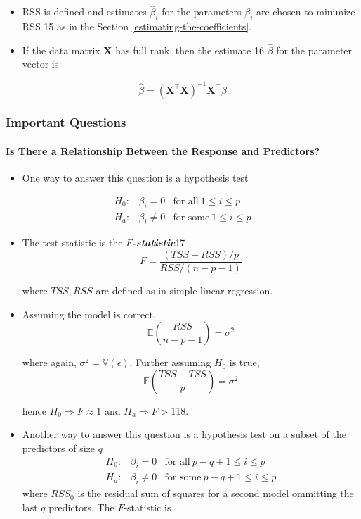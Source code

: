 \documentclass[11pt]{article}
\providecommand{\tightlist}{%
      \setlength{\itemsep}{0pt}\setlength{\parskip}{0pt}}
\begin{document}
    \begin{itemize}
\item
  RSS is defined and estimates \(\hat{\beta}_i\) for the parameters
  \(\beta_i\) are chosen to minimize RSS 15 as in the
  Section \ref{estimating-the-coefficients}.
\item
  If the data matrix \(\mathbf{X}\) has full rank, then the estimate 16
  \(\hat{\beta}\) for the parameter vector is
\end{itemize}

\[ \hat{\beta} = (\mathbf{X}^\top \mathbf{X})^{-1}\mathbf{X}^\top \beta \]

    \hypertarget{important-questions}{%
\subsubsection{Important Questions}\label{important-questions}}

    \hypertarget{is-there-a-relationship-between-the-response-and-predictors}{%
\paragraph{Is There a Relationship Between the Response and
Predictors?}\label{is-there-a-relationship-between-the-response-and-predictors}}

    \begin{itemize}
\tightlist
\item
  One way to answer this question is a hypothesis test
\end{itemize}

\begin{align*}
H_0:& \beta_i = 0 &\text{for all}\ 1 \leqslant i \leqslant p\\
H_a:& \beta_i \neq 0&\text{for some}\ 1 \leqslant i \leqslant p
\end{align*}

\begin{itemize}
\item
  The test statistic is the \textbf{\emph{\(F\)-statistic}}17
  \[ F = \frac{(TSS - RSS)/p}{RSS/(n - p - 1)} \]

  where \(TSS, RSS\) are defined as in simple linear regression.
\item
  Assuming the model is correct,
  \[ \mathbb{E}\left(\frac{RSS}{n-p-1}\right) = \sigma^2 \]

  where again, \(\sigma^2 = \mathbb{V}(\epsilon)\). Further assuming
  \(H_0\) is true,
  \[ \mathbb{E}\left(\frac{TSS - TSS}{p}\right) = \sigma^2 \]

  hence \(H_0 \Rightarrow F \approx 1\) and \(H_a \Rightarrow F > 1\)18.
\item
  Another way to answer this question is a hypothesis test on a subset
  of the predictors of size \(q\) \begin{align*}
  H_0:& \beta_{i} = 0 &\text{for all}\ p - q + 1 \leqslant i \leqslant p\\
  H_a:& \beta_i \neq 0  &\text{for some}\ p - q + 1  \leqslant i \leqslant p
  \end{align*} where \(RSS_0\) is the residual sum of squares for a
  second model ommitting the last \(q\) predictors. The \(F\)-statistic
  is
\end{itemize}
\end{document}
